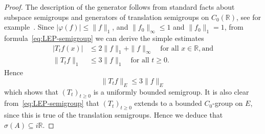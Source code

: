 \documentclass[sn-mathphys]{sn-jnl}%
\theoremstyle{thmstyleone}
\theoremstyle{thmstylethree}
\newcommand{\RR}{\mathbb{R}}
\begin{document}
\begin{proof}
	The description of the generator follows from standard facts about subspace semigroups and generators of translation semigroups on $C_0(\RR)$, see for example~\cite[Chapter II, 2.2.3 \& 2.2.10]{EN00}. Since $\lvert \varphi(f)\rvert \le \|f\|_1$, and $\|f_0\|_\infty \le 1$ and $\|f_0\|_1 = 1$, from formula~\eqref{eq:LEP-semigroup} we can derive the simple estimates
	\begin{align*}
		\lvert T_tf(x)\rvert &\le 2\|f\|_1 + \|f\|_\infty \quad\text{for all }x \in \RR, \text{and} \\
		\|T_t f\|_1 &\le 3\|f\|_1 \quad\text{for all } t \ge 0.
	\end{align*}
	Hence
	\begin{equation*}
		\|T_t f\|_E \le 3\|f\|_E
	\end{equation*}
	which shows that $(T_t)_{t\ge 0}$ is a uniformly bounded semigroup. It is also clear from~\eqref{eq:LEP-semigroup} that $(T_t)_{t\ge 0}$ extends to a bounded $C_0$-group on $E$, since this is true of the translation semigroups. Hence we deduce that $\sigma(A) \subseteq i\RR$.
	

\end{proof}
\end{document}
